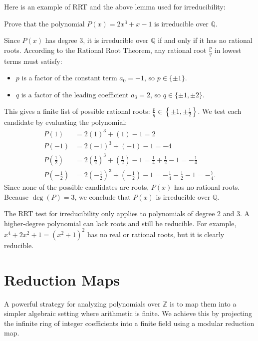 \documentclass[11pt]{scrartcl}
\begin{document}
Here is an example of RRT and the above lemma used for irreducibility:

\begin{example*}
Prove that the polynomial $P(x) = 2x^3 + x - 1$ is irreducible over $\mathbb{Q}$.
\end{example*}

Since $P(x)$ has degree $3$, it is irreducible over $\mathbb{Q}$ if and only if it has no rational roots. According to the Rational Root Theorem, any rational root $\frac{p}{q}$ in lowest terms must satisfy:
\begin{itemize}
\item $p$ is a factor of the constant term $a_0 = -1$, so $p \in \{\pm 1\}$.
\item $q$ is a factor of the leading coefficient $a_3 = 2$, so $q \in \{\pm 1, \pm 2\}$.
\end{itemize}
This gives a finite list of possible rational roots: $\frac{p}{q} \in \left\{\pm 1, \pm \frac{1}{2}\right\}$. We test each candidate by evaluating the polynomial:
\begin{align*}
P(1) &= 2(1)^3 + (1) - 1 = 2 \\
P(-1) &= 2(-1)^3 + (-1) - 1 = -4 \\
P\left(\frac{1}{2}\right) &= 2\left(\frac{1}{2}\right)^3 + \left(\frac{1}{2}\right) - 1 = \frac{1}{4} + \frac{1}{2} - 1 = -\frac{1}{4} \\
P\left(-\frac{1}{2}\right) &= 2\left(-\frac{1}{2}\right)^3 + \left(-\frac{1}{2}\right) - 1 = -\frac{1}{4} - \frac{1}{2} - 1 = -\frac{7}{4}.
\end{align*}
Since none of the possible candidates are roots, $P(x)$ has no rational roots. Because $\deg(P) = 3$, we conclude that $P(x)$ is irreducible over $\mathbb{Q}$.

\begin{remark*}
The RRT test for irreducibility only applies to polynomials of degree $2$ and $3$. A higher-degree polynomial can lack roots and still be reducible. For example, $x^4 + 2x^2 + 1 = (x^2+1)^2$ has no real or rational roots, but it is clearly reducible.
\end{remark*}

\section{Reduction Maps}

A powerful strategy for analyzing polynomials over $\mathbb{Z}$ is to map them into a simpler algebraic setting where arithmetic is finite. We achieve this by projecting the infinite ring of integer coefficients into a finite field using a modular reduction map.
\end{document}

